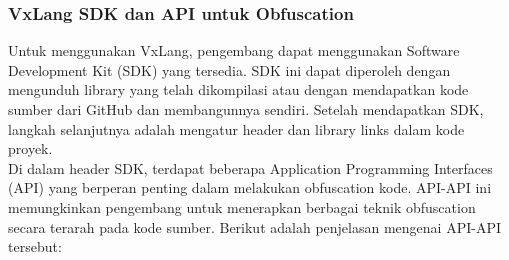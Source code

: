 \subsubsection{VxLang SDK dan API untuk Obfuscation}
Untuk menggunakan VxLang, pengembang dapat menggunakan Software Development Kit (SDK) yang tersedia. SDK ini dapat diperoleh dengan mengunduh library yang telah dikompilasi atau dengan mendapatkan kode sumber dari GitHub dan membangunnya sendiri. Setelah mendapatkan SDK, langkah selanjutnya adalah mengatur header dan library links dalam kode proyek. \\

Di dalam header SDK, terdapat beberapa Application Programming Interfaces (API) yang berperan penting dalam melakukan obfuscation kode. API-API ini memungkinkan pengembang untuk menerapkan berbagai teknik obfuscation secara terarah pada kode sumber. Berikut adalah penjelasan mengenai API-API tersebut:

